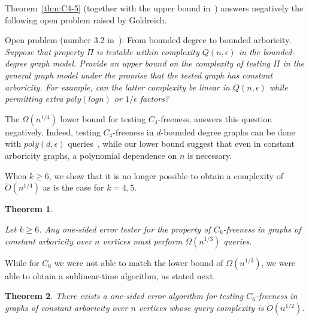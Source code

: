 \documentclass{article}
\newcommand{\eps}{\epsilon}
\newcommand{\poly}{\textrm{poly}}
\newtheorem{theorem}{Theorem}
\newcommand{\commentt}[1]{ {}}
\newcommand{\talya}[1]{{} }
\newcommand{\ICALPCR}[1]{{#1}}
\begin{document}
Theorem~\ref{thm:C4-5} \ICALPCR{(together with the upper bound in~\cite{GR-bound})}
answers negatively  the following open problem raised by Goldreich.

\smallskip\noindent\textsf{Open problem (number 3.2 in~\cite{goldreich2021open}): From bounded degree to bounded arboricity.} \newline
\textit{Suppose that property $\Pi$ is
testable within complexity $Q(n,\eps)$ in the bounded-degree graph model. Provide an upper
bound on the complexity of testing $\Pi$ in the general graph model under the promise that the tested graph has constant arboricity. For example, can the latter complexity be linear in $Q(n,\eps)$ while
permitting extra $poly(log n)$ or $1/\eps$ factors?}
\smallskip

The $\Omega(n^{1/4})$ lower bound for testing $C_4$-freeness, answers this question negatively. Indeed, %
testing $C_4$-freeness in $d$-bounded degree graphs  can be done with $poly(d,\eps)$ queries~\cite{GR-bound}, while our lower bound suggest that even in constant  arboricity graphs, a polynomial dependence on $n$ is necessary.

\smallskip
When $k \geq 6$, we show that it is no longer possible to obtain a complexity of $\widetilde{O}(n^{1/4})$ as is the case for $k=4,5$.

\newcommand{\GenLB}{
Let $k\geq 6$.
Any one-sided error tester for the property of $C_k$-freeness in graphs of constant arboricity over  $n$ vertices 
must perform $\Omega(n^{1/3})$ queries.
}


\begin{theorem}\label{thm:lb_ck_const_alpha}
\GenLB
\end{theorem}


While for $C_6$ we were not able to match the lower bound of $\Omega(n^{1/3})$, we were able to obtain a sublinear-time algorithm, as stated next.


\begin{theorem}\label{thm:C6-ub-intro}
There exists a one-sided error algorithm for testing $C_6$-freeness in graphs of constant arboricity  over $n$ vertices whose query complexity %
is $\widetilde{O}(n^{1/2})$.
\end{theorem}

\end{document}
